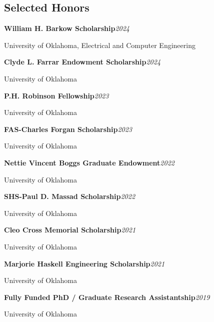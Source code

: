 \documentclass[9pt,letterpaper]{extarticle}
\newcommand{\entry}[2]{\Needspace{4\baselineskip}\textbf{#1}\hfill\textit{#2}\par}
\begin{document}
\subsection{Selected Honors}
\entry{William H. Barkow Scholarship}{2024}
{\small University of Oklahoma, Electrical and Computer Engineering\par}
\entry{Clyde L. Farrar Endowment Scholarship}{2024}
{\small University of Oklahoma\par}
\entry{P.H. Robinson Fellowship}{2023}
{\small University of Oklahoma\par}
\entry{FAS-Charles Forgan Scholarship}{2023}
{\small University of Oklahoma\par}
\entry{Nettie Vincent Boggs Graduate Endowment}{2022}
{\small University of Oklahoma\par}
\entry{SHS-Paul D. Massad Scholarship}{2022}
{\small University of Oklahoma\par}
\entry{Cleo Cross Memorial Scholarship}{2021}
{\small University of Oklahoma\par}
\entry{Marjorie Haskell Engineering Scholarship}{2021}
{\small University of Oklahoma\par}
\entry{Fully Funded PhD / Graduate Research Assistantship}{2019}
{\small University of Oklahoma\par}
\end{document}

